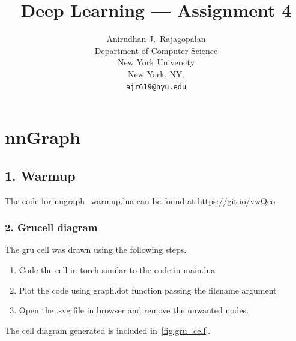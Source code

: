 \documentclass{article}
\title{Deep Learning --- Assignment 4}
\author{Anirudhan J.~Rajagopalan \\
  Department of Computer Science\\
  New York University\\
  New York, NY.\\
  \texttt{ajr619@nyu.edu} \\
}
\begin{document}
\maketitle

\section{nnGraph}
\subsection{1. Warmup}
The code for nngraph\_warmup.lua can be found at \url{https://git.io/vwQco}

\subsubsection{2. Grucell diagram}
The gru cell was drawn using the following steps.
\begin{enumerate}
  \item Code the cell in torch similar to the code in main.lua
  \item Plot the code using graph.dot function passing the filename argument
  \item Open the .svg file in browser and remove the unwanted nodes.
\end{enumerate}

The cell diagram generated is included in~\ref{fig:gru_cell}.
\end{document}

